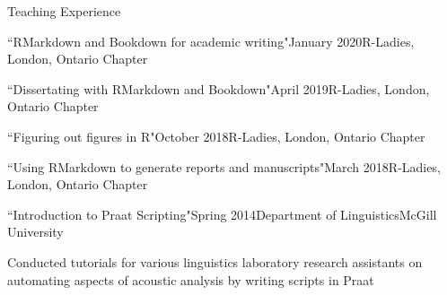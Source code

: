 \documentclass{resume} %
\begin{document}
\begin{rSection}{Teaching Experience}
	\begin{rSubsection}{``RMarkdown and Bookdown for academic writing"}{January 2020}{R-Ladies, London, Ontario Chapter}{}
	\end{rSubsection}

	\begin{rSubsection}{``Dissertating with RMarkdown and Bookdown"}{April 2019}{R-Ladies, London, Ontario Chapter}{}
	\end{rSubsection}
	
	\begin{rSubsection}{``Figuring out figures in R"}{October 2018}{R-Ladies, London, Ontario Chapter}{}
	\end{rSubsection}
	
	
	\begin{rSubsection}{``Using RMarkdown to generate reports and manuscripts"}{March 2018}{R-Ladies, London, Ontario Chapter}{}
	\end{rSubsection}
	
	
	\begin{rSubsection}{``Introduction to Praat Scripting"}{Spring 2014}{Department of Linguistics}{McGill University}
		\item Conducted tutorials for various linguistics laboratory research assistants on automating aspects of acoustic analysis by writing scripts in Praat
	\end{rSubsection}

\end{rSection}





\end{document}

